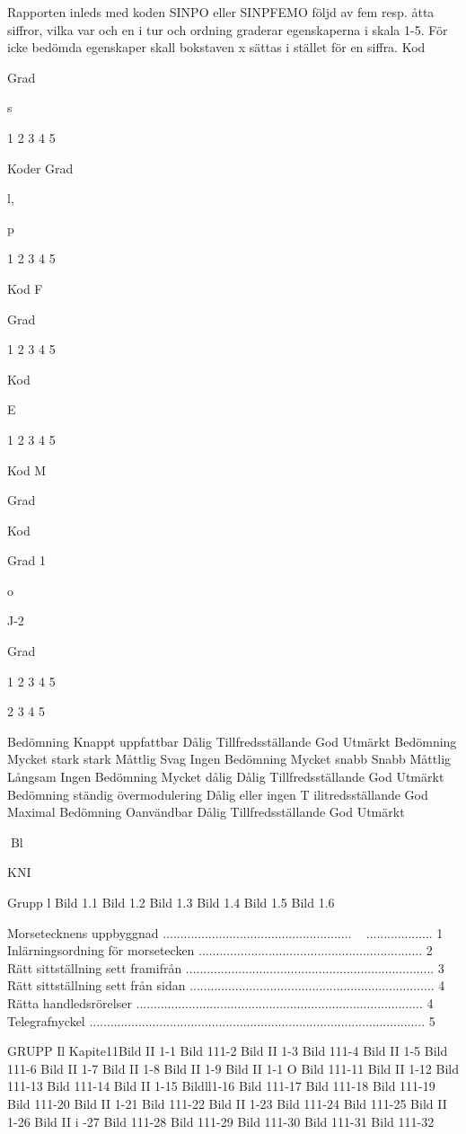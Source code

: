 \documentclass[a4paper,twoside,twocolumn,openright]{book}
\begin{document}
{{{{{{{{{{{Rapporten inleds med koden SINPO eller
SINPFEMO följd av fem resp. åtta siffror,
vilka var och en i tur och ordning graderar
egenskaperna i skala 1-5. För icke bedömda
egenskaper skall bokstaven x sättas i stället
för en siffra.
Kod

Grad

s

1
2
3
4
5

Koder Grad

l,

p

1
2
3
4
5

Kod
F

Grad

1
2
3
4
5

Kod

E

1
2
3
4
5

Kod
M

Grad

Kod

Grad
1

o

J-2

Grad

1
2
3
4
5

2
3
4
5

Bedömning
Knappt uppfattbar
Dålig
Tillfredsställande
God
Utmärkt
Bedömning
Mycket stark
stark
Måttlig
Svag
Ingen
Bedömning
Mycket snabb
Snabb
Måttlig
Långsam
Ingen
Bedömning
Mycket dålig
Dålig
Tillfredsställande
God
Utmärkt
Bedömning
ständig övermodulering
Dålig eller ingen
T ilitredsställande
God
Maximal
Bedömning
Oanvändbar
Dålig
Tillfredsställande
God
Utmärkt

Bl

KNI

Grupp l
Bild 1.1
Bild 1.2
Bild 1.3
Bild 1.4
Bild 1.5
Bild 1.6

Morsetecknens uppbyggnad ...................................................... ~ ................... 1
Inlärningsordning för morsetecken ................................................................ 2
Rätt sittställning sett framifrån ....................................................................... 3
Rätt sittställning sett från sidan ...................................................................... 4
Rätta handledsrörelser .................................................................................. 4
Telegrafnyckel ................................................................................................ 5

GRUPP Il
Kapite11Bild II 1-1
Bild 111-2
Bild II 1-3
Bild 111-4
Bild II 1-5
Bild 111-6
Bild II 1-7
Bild II 1-8
Bild II 1-9
Bild II 1-1 O
Bild 111-11
Bild II 1-12
Bild 111-13
Bild 111-14
Bild II 1-15
Bildll1-16
Bild 111-17
Bild 111-18
Bild 111-19
Bild 111-20
Bild II 1-21
Bild 111-22
Bild II 1-23
Bild 111-24
Bild 111-25
Bild II 1-26
Bild II i -27
Bild 111-28
Bild 111-29
Bild 111-30
Bild 111-31
Bild 111-32

}}}}}}}}}}}
\end{document}

